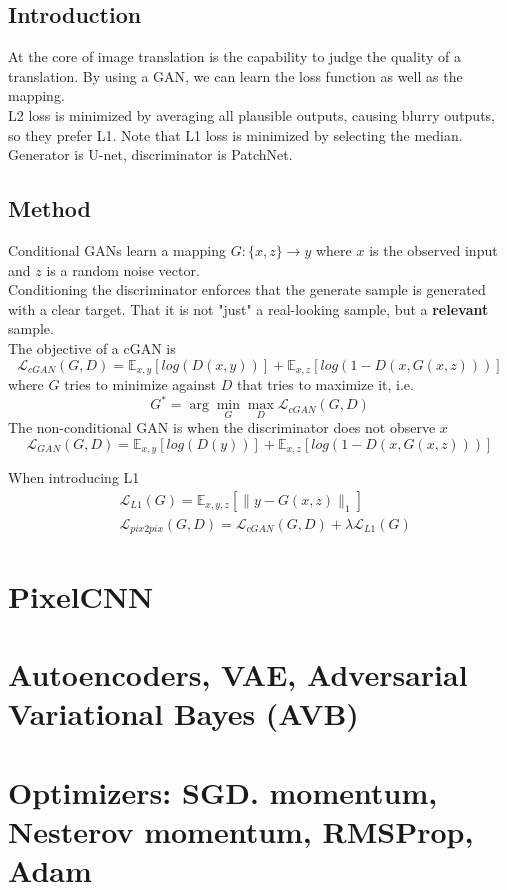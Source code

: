 \documentclass[../main.tex]{subfiles}
\begin{document}
\subsection{Introduction}
At the core of image translation is the capability to judge the quality of a translation. By using a GAN,
we can learn the loss function as well as the mapping. \\
L2 loss is minimized by averaging all plausible outputs, causing blurry outputs, so they prefer L1.
Note that L1 loss is minimized by selecting the median. \\
Generator is U-net, discriminator is PatchNet.

\subsection{Method}
Conditional GANs learn a mapping $G: \{x, z\} \rightarrow y$ where $x$ is the observed input and $z$
is a random noise vector. \\
Conditioning the discriminator enforces that the generate sample is generated with a clear target.
That it is not "just" a real-looking sample, but a \textbf{relevant} sample. \\
The objective of a cGAN is
\begin{equation}
    \mathcal{L}_{cGAN}(G, D) = \mathbb{E}_{x,y}[log(D(x,y))] + \mathbb{E}_{x,z}[log(1-D(x, G(x, z)))]
\end{equation}
where $G$ tries to minimize against $D$ that tries to maximize it, i.e.
\begin{equation}
    G^* = \arg \min_G \max_D \mathcal{L}_{cGAN}(G, D)
\end{equation}
The non-conditional GAN is when the discriminator does not observe $x$
\begin{equation}
    \mathcal{L}_{GAN}(G, D) = \mathbb{E}_{x,y}[log(D(y))] + \mathbb{E}_{x,z}[log(1-D(x, G(x, z)))]
\end{equation}

When introducing L1
\begin{align}
    &\mathcal{L}_{L1}(G) = \mathbb{E}_{x,y,z}[\|y - G(x, z)\|_1] \\
    &\mathcal{L}_{pix2pix}(G, D) = \mathcal{L}_{cGAN}(G, D) + \lambda \mathcal{L}_{L1}(G)
\end{align}


\section{PixelCNN}
\section{Autoencoders, VAE, Adversarial Variational Bayes (AVB)}
\section{Optimizers: SGD. momentum, Nesterov momentum, RMSProp, Adam}
\end{document}
